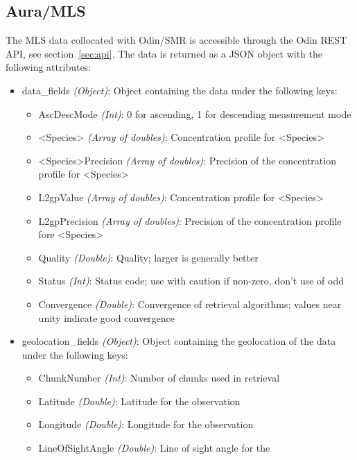 \label{sec:dataformat}
\subsection{Aura/MLS}
The MLS data collocated with Odin/SMR is accessible through the Odin REST
API, see section~\ref{sec:api}. The data is returned as a JSON object with the
following attributes:
\begin{itemize}
    \item data\_fields \emph{(Object)}: Object containing the data under the
        following keys:
        \begin{itemize}
            \item AscDescMode \emph{(Int)}: 0 for ascending, 1 for descending
                measurement mode
            \item <Species> \emph{(Array of doubles)}: Concentration profile
                for <Species>
            \item <Species>Precision \emph{(Array of doubles)}: Precision of
                the concentration profile for <Species>
            \item L2gpValue \emph{(Array of doubles)}: Concentration profile
                for <Species>
            \item L2gpPrecision \emph{(Array of doubles)}: Precision of the
                concentration profile fore <Species>
            \item Quality \emph{(Double)}: Quality; larger is generally better
            \item Status \emph{(Int)}: Status code; use with caution if
                non-zero, don't use of odd
            \item Convergence \emph{(Double)}: Convergence of retrieval
                algorithms; values near unity indicate good convergence
        \end{itemize}
    \item geolocation\_fields \emph{(Object)}: Object containing the
        geolocation of the data under the following keys:
        \begin{itemize}
            \item ChunkNumber \emph{(Int)}: Number of chunks used in retrieval
            \item Latitude \emph{(Double)}: Latitude for the observation
            \item Longitude \emph{(Double)}: Longitude for the observation
            \item LineOfSightAngle \emph{(Double)}: Line of sight angle for the

\end{itemize}
\end{itemize}
